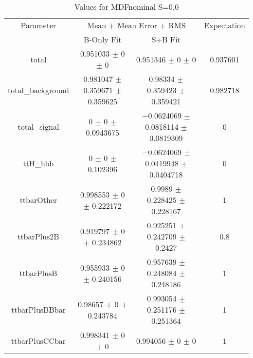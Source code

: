 \begin{table}
\centering
\caption{Values for MDFnominal S=0.0}
\begin{tabular}{cccc}
\toprule
Parameter & \multicolumn{2}{c}{Mean $\pm$ Mean Error $\pm$ RMS} & Expectation\\
 & B-Only Fit & S+B Fit & \\
\midrule
total & \num{0.951033} $\pm$ \num{0} $\pm$ \num{0} & \num{0.951346} $\pm$ \num{0} $\pm$ \num{0} & \num{0.937601}\\
total\_background & \num{0.981047} $\pm$ \num{0.359671} $\pm$ \num{0.359625} & \num{0.98334} $\pm$ \num{0.359423} $\pm$ \num{0.359421} & \num{0.982718}\\
total\_signal & \num{0} $\pm$ \num{0} $\pm$ \num{0.0943675} & \num{-0.0624069} $\pm$ \num{0.0818114} $\pm$ \num{0.0819309} & \num{0}\\
ttH\_hbb & \num{0} $\pm$ \num{0} $\pm$ \num{0.102396} & \num{-0.0624069} $\pm$ \num{0.0419948} $\pm$ \num{0.0404718} & \num{0}\\
ttbarOther & \num{0.998553} $\pm$ \num{0} $\pm$ \num{0.222172} & \num{0.9989} $\pm$ \num{0.228425} $\pm$ \num{0.228167} & \num{1}\\
ttbarPlus2B & \num{0.919797} $\pm$ \num{0} $\pm$ \num{0.234862} & \num{0.925251} $\pm$ \num{0.242709} $\pm$ \num{0.2427} & \num{0.8}\\
ttbarPlusB & \num{0.955933} $\pm$ \num{0} $\pm$ \num{0.240156} & \num{0.957639} $\pm$ \num{0.248084} $\pm$ \num{0.248186} & \num{1}\\
ttbarPlusBBbar & \num{0.98657} $\pm$ \num{0} $\pm$ \num{0.243784} & \num{0.993054} $\pm$ \num{0.251176} $\pm$ \num{0.251364} & \num{1}\\
ttbarPlusCCbar & \num{0.998341} $\pm$ \num{0} $\pm$ \num{0} & \num{0.994056} $\pm$ \num{0} $\pm$ \num{0} & \num{1}\\
\bottomrule
\end{tabular}
\end{table}